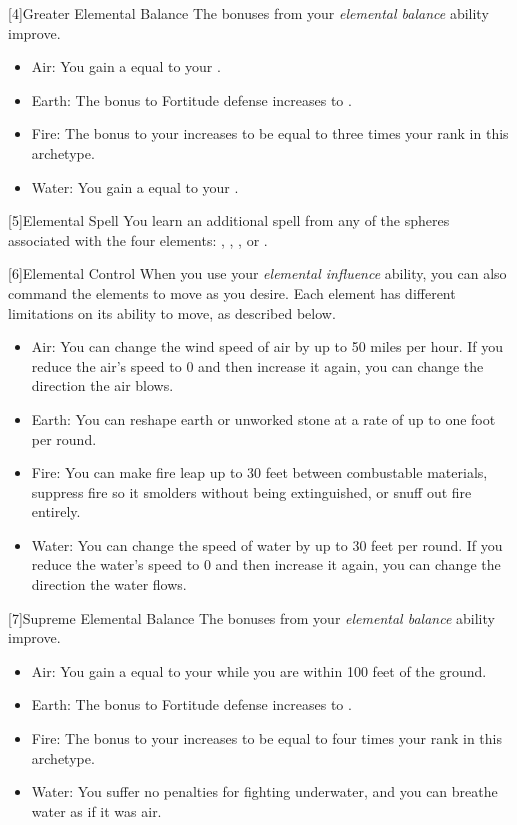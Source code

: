         [4]{Greater Elemental Balance} The bonuses from your \textit{elemental balance} ability improve.
        \begin{itemize}
            \item Air: You gain a  equal to your .
            \item Earth: The bonus to Fortitude defense increases to .
            \item Fire: The bonus to your  increases to be equal to three times your rank in this archetype.
            \item Water: You gain a  equal to your .
        \end{itemize}

        [5]{Elemental Spell} You learn an additional spell from any of the spheres associated with the four elements: , , , or .

        [6]{Elemental Control} When you use your \textit{elemental influence} ability, you can also command the elements to move as you desire.
        Each element has different limitations on its ability to move, as described below.
        \begin{itemize}
            \item Air: You can change the wind speed of air by up to 50 miles per hour.
                If you reduce the air's speed to 0 and then increase it again, you can change the direction the air blows.
            \item Earth: You can reshape earth or unworked stone at a rate of up to one foot per round.
            \item Fire: You can make fire leap up to 30 feet between combustable materials, suppress fire so it smolders without being extinguished, or snuff out fire entirely.
            \item Water: You can change the speed of water by up to 30 feet per round.
                If you reduce the water's speed to 0 and then increase it again, you can change the direction the water flows.
        \end{itemize}

        [7]{Supreme Elemental Balance} The bonuses from your \textit{elemental balance} ability improve.
        \begin{itemize}
            \item Air: You gain a  equal to your  while you are within 100 feet of the ground.
            \item Earth: The bonus to Fortitude defense increases to .
            \item Fire: The bonus to your  increases to be equal to four times your rank in this archetype.
            \item Water: You suffer no penalties for fighting underwater, and you can breathe water as if it was air.
        \end{itemize}

